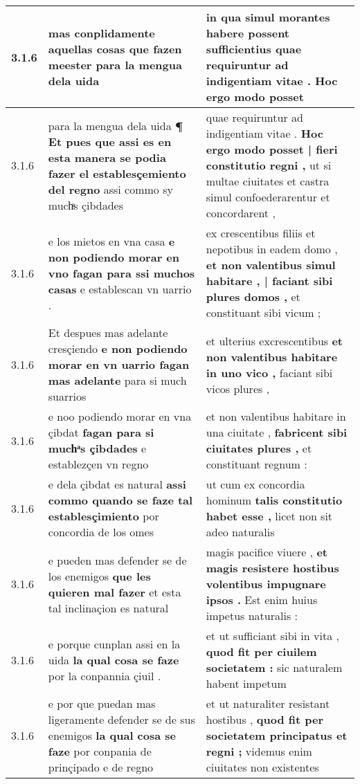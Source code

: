 \begin{tabular}{|p{1cm}|p{6.5cm}|p{6.5cm}|}
3.1.6 & mas conplidamente aquellas cosas \textbf{ que fazen meester } para la mengua dela uida & in qua simul morantes habere possent sufficientius \textbf{ quae requiruntur ad indigentiam vitae . } Hoc ergo modo posset \\\hline
3.1.6 & para la mengua dela uida \textbf{ ¶ Et pues que assi es en esta manera se podia fazer el establesçemiento del regno } assi commo sy muchͣs çibdades & quae requiruntur ad indigentiam vitae . \textbf{ Hoc ergo modo posset | fieri constitutio regni , } ut si multae ciuitates et castra simul confoederarentur et concordarent , \\\hline
3.1.6 & e los mietos en vna casa \textbf{ e non podiendo morar en vno fagan para ssi muchos casas } e establescan vn uarrio . & ex crescentibus filiis et nepotibus in eadem domo , \textbf{ et non valentibus simul habitare , | faciant sibi plures domos , } et constituant sibi vicum ; \\\hline
3.1.6 & Et despues mas adelante cresçiendo \textbf{ e non podiendo morar en vn uarrio fagan mas adelante } para si much suarrios & et ulterius excrescentibus \textbf{ et non valentibus habitare in uno vico , } faciant sibi vicos plures , \\\hline
3.1.6 & e noo podiendo morar en vna çibdat \textbf{ fagan para si muchͣs çibdades } e establezçen vn regno & et non valentibus habitare in una ciuitate , \textbf{ fabricent sibi ciuitates plures , } et constituant regnum : \\\hline
3.1.6 & e dela çibdat es natural \textbf{ assi commo quando se faze tal establesçimiento } por concordia de los omes & ut cum ex concordia hominum \textbf{ talis constitutio habet esse , } licet non sit adeo naturalis \\\hline
3.1.6 & e pueden mas defender se de los enemigos \textbf{ que les quieren mal fazer } et esta tal inclinaçion es natural & magis pacifice viuere , \textbf{ et magis resistere hostibus volentibus impugnare ipsos . } Est enim huius impetus naturalis : \\\hline
3.1.6 & e porque cunplan assi en la uida \textbf{ la qual cosa se faze } por la conpannia çiuil . & et ut sufficiant sibi in vita , \textbf{ quod fit per ciuilem societatem : } sic naturalem habent impetum \\\hline
3.1.6 & e por que puedan mas ligeramente defender se de sus enemigos \textbf{ la qual cosa se faze } por conpania de prinçipado e de regno & et ut naturaliter resistant hostibus , \textbf{ quod fit per societatem principatus et regni ; } videmus enim ciuitates non existentes \\\hline

\end{tabular}
